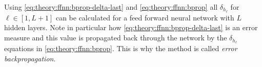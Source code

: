 Using \eqref{eq:theory:ffnn:bprop-delta-last} and \eqref{eq:theory:ffnn:bprop} all $\delta_{h_\ell}$ for $\ell \in [1, L+1]$ can be calculated for a feed forward neural network with $L$ hidden layers. Note in particular how \eqref{eq:theory:ffnn:bprop-delta-last} is an error measure and this value is propagated back through the network by the $\delta_{h_\ell}$ equations in \eqref{eq:theory:ffnn:bprop}. This is why the method is called \textit{error backpropagation}.
